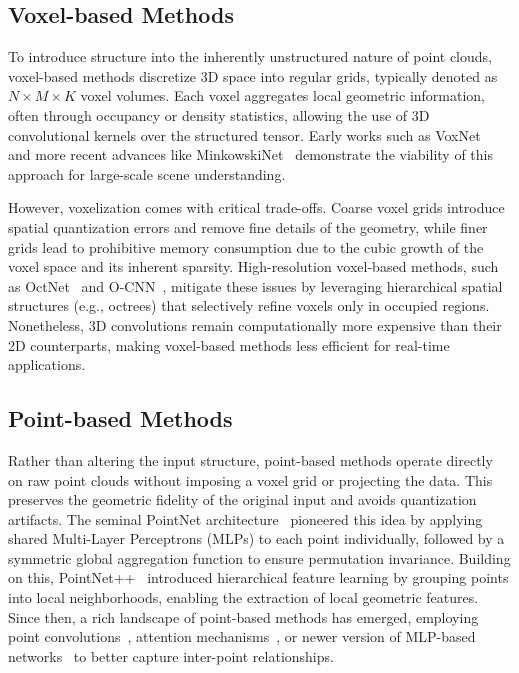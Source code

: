 \subsection{Voxel-based Methods}
To introduce structure into the inherently unstructured nature of point clouds,
voxel-based methods discretize 3D space into regular grids, typically denoted
as $N \times M \times K$ voxel volumes. Each voxel aggregates local geometric
information, often through occupancy or density statistics, allowing the use of
3D convolutional kernels over the structured tensor. Early works such as
VoxNet~\cite{maturana2015voxnet} and more recent advances like
MinkowskiNet~\cite{choy20194d} demonstrate the viability of this approach for
large-scale scene understanding.
%

However, voxelization comes with critical trade-offs. Coarse voxel grids
introduce spatial quantization errors and remove fine details of the geometry,
while finer grids lead to prohibitive memory consumption due to the cubic
growth of the voxel space and its inherent sparsity. High-resolution
voxel-based methods, such as OctNet~\cite{riegler2017octnet} and
O-CNN~\cite{wang2017cnn}, mitigate these issues by leveraging hierarchical
spatial structures (e.g., octrees) that selectively refine voxels only in
occupied regions. Nonetheless, 3D convolutions remain computationally more
expensive than their 2D counterparts, making voxel-based methods less efficient
for real-time applications.

\subsection{Point-based Methods}
Rather than altering the input structure, point-based methods operate directly
on raw point clouds without imposing a voxel grid or projecting the data. This
preserves the geometric fidelity of the original input and avoids quantization
artifacts. The seminal PointNet architecture~\cite{qi2017pointnet} pioneered
this idea by applying shared Multi-Layer Perceptrons (MLPs) to each point
individually, followed by a symmetric global aggregation function to ensure
permutation invariance.
%
Building on this, PointNet++~\cite{qi2017pointnet++} introduced hierarchical
feature learning by grouping points into local neighborhoods, enabling the
extraction of local geometric features.
%
Since then, a rich landscape of point-based methods has emerged, employing
point convolutions~\cite{thomas2019kpconv}, attention
mechanisms~\cite{zhao2021point}, or newer version of MLP-based
networks~\cite{qian2022pointnext} to better capture inter-point relationships.

